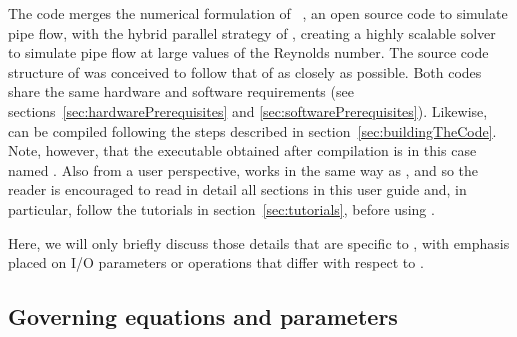 \documentclass[a4paper, 11pt, DIV=11]{scrartcl}
\begin{document}
The code \nsp merges the numerical formulation of \opf~\cite{Willis2017}, an
open source code to simulate pipe flow, with the hybrid parallel strategy of \nsc,
creating a highly scalable solver to simulate pipe flow at large values of the
Reynolds number. The source code structure of \nsp was conceived to follow that of
\nsc as closely as possible. Both codes share the same hardware and software
requirements (see sections~\ref{sec:hardwarePrerequisites} and
\ref{sec:softwarePrerequisites}). Likewise, \nsp can be compiled following the
steps described in section~\ref{sec:buildingTheCode}. Note, however, that the
executable obtained after compilation is in this case named .
Also from a user perspective, \nsp works in the same way as \nsc, and so the reader
is encouraged to read in detail all sections in this user guide and, in particular,
follow the tutorials in section~\ref{sec:tutorials}, before using \nsp.
\par
Here, we will only briefly discuss those details that are specific to \nsp,
with emphasis placed on I/O parameters or operations that differ with respect to \nsc.

\subsection{Governing equations and parameters}
\label{sec:nspGoverningEquations}
\end{document}
